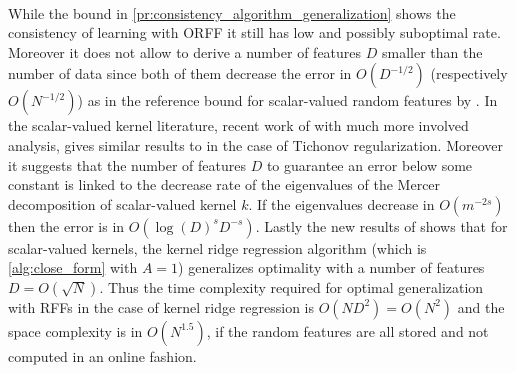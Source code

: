\paragraph{}
While the bound in \cref{pr:consistency_algorithm_generalization} shows the
consistency of learning with \acs{ORFF} it still has low and possibly
suboptimal rate. Moreover it does not allow to derive a number of features $D$
smaller than the number of data since both of them decrease the error in
$O(D^{-1/2})$ (respectively $O(N^{-1/2})$) as in the reference bound for
scalar-valued random features by \citet{rahimi2009weighted}. In the
scalar-valued kernel literature, recent work of \citet{bach2015equivalence}
with much more involved analysis, gives similar results to
\citet{rahimi2009weighted} in the case of Tichonov regularization.  Moreover it
suggests that the number of features $D$ to guarantee an error below some
constant is linked to the decrease rate of the eigenvalues of the Mercer
decomposition of scalar-valued kernel $k$. If the eigenvalues decrease in
$O(m^{-2s})$ then the error is in $O\left(\log(D)^s D^{-s}\right)$. Lastly the
new results of \citet{rudi2016generalization} shows that for scalar-valued
kernels, the kernel ridge regression algorithm (which is \cref{alg:close_form}
with $A = 1$) generalizes optimality with a number of features $D=O(\sqrt{N})$.
Thus the time complexity required for optimal generalization with \acsp{RFF} in
the case of kernel ridge regression is $O(ND^2)=O(N^{2})$ and the space
complexity is in $O(N^{1.5})$, if the random features are all stored and not
computed in an online fashion.

\chapterend
